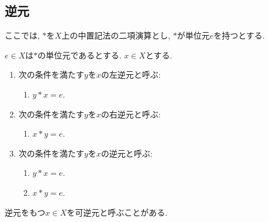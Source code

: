\subsection{逆元}
ここでは, $\ast$を$X$上の中置記法の二項演算とし,
$\ast$が単位元$e$を持つとする.
\begin{definition}
  $e\in X$は$\ast$の単位元であるとする.
  $x\in X$とする.
  \begin{enumerate}
  \item 次の条件を満たす$y$を$x$の左逆元と呼ぶ:
    \begin{enumerate}
      \item $y\ast x=e$.
    \end{enumerate}
  \item 次の条件を満たす$y$を$x$の右逆元と呼ぶ:
    \begin{enumerate}
      \item $x\ast y=e$.
    \end{enumerate}
  \item 次の条件を満たす$y$を$x$の逆元と呼ぶ:
    \begin{enumerate}
      \item $y\ast x=e$.
    \item $x\ast y=e$.
    \end{enumerate}  
  \end{enumerate}
  逆元をもつ$x\in X$を可逆元と呼ぶことがある.
\end{definition}

